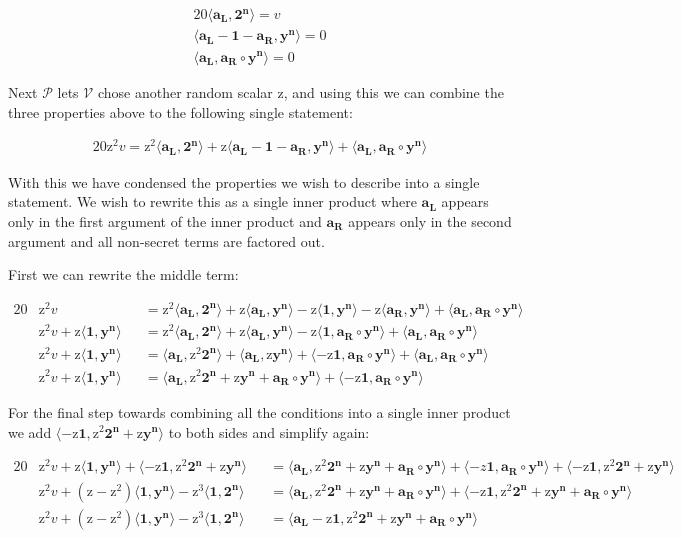 \documentclass{article}
\newcommand{\eq}[1]{\begin{alignat*}{20}#1\end{alignat*}}
\renewcommand{\vec}[1]{\boldsymbol{#1}}
\newcommand{\ran}[1]{\mathrm{#1}}
\newcommand{\vecran}[1]{\mathbf{#1}}
\newcommand{\V}{\mathcal{V}}
\renewcommand{\P}{\mathcal{P}}
\newcommand{\dotp}[2]{\langle #1, #2 \rangle}
\newcommand{\opn}[1]{\operatorname{#1}}
\newcommand{\vecl}[1]{\vec{#1_{\opn{L}}}}
\newcommand{\vecr}[1]{\vec{#1_{\opn{R}}}}
\begin{document}
\eq{
	\dotp{\vecl{a}}{\vec{2^n}} = v \\
	\dotp{\vecl{a} - \vec{1} - \vecr{a}}{\vecran{y^n}} = 0 \\
	\dotp{\vecl{a}}{\vecr{a}\circ \vecran{y^n}} = 0
}

Next $\P$ lets $\V$ chose another random scalar $\ran{z}$, and using
this we can combine the three properties above to the following single
statement:

\eq{
	\ran{z^2}v = 
	\ran{z^2}\dotp{\vecl{a}}{\vec{2^n}} +
	\ran{z}\dotp{\vecl{a} - \vec{1} - \vecr{a}}{\vecran{y^n}} +
	\dotp{\vecl{a}}{\vecr{a}\circ \vecran{y^n}}
}

With this we have condensed the properties we wish to describe into
a single statement. We wish to rewrite this as a single inner product
where $\vecl{a}$ appears only in the first argument of the inner product
and $\vecr{a}$ appears only in the second argument and all non-secret
terms are factored out.

First we can rewrite the middle term:

\eq{	
	&\ran{z^2}v &&= 
	\ran{z^2}\dotp{\vecl{a}}{\vec{2^n}} +
	\ran{z}\dotp{\vecl{a}}{\vecran{y^n}} -
	\ran{z}\dotp{\vec{1}}{\vecran{y^n}} -
	\ran{z}\dotp{\vecr{a}}{\vecran{y^n}} +
	\dotp{\vecl{a}}{\vecr{a}\circ \vecran{y^n}} \\
	&\ran{z^2}v + \ran{z}\dotp{\vec{1}}{\vecran{y^n}} 
	&&= \ran{z^2}\dotp{\vecl{a}}{\vec{2^n}} +
	\ran{z}\dotp{\vecl{a}}{\vecran{y^n}} -
	\ran{z}\dotp{\vec{1}}{\vecr{a}\circ\vecran{y^n}} +
	\dotp{\vecl{a}}{\vecr{a}\circ \vecran{y^n}} \\
	&\ran{z^2}v + \ran{z}\dotp{\vec{1}}{\vecran{y^n}} 
	&&= \dotp{\vecl{a}}{\ran{z^2}\vec{2^n}} +
	\dotp{\vecl{a}}{\ran{z}\vecran{y^n}} +
	\dotp{-\ran{z}\vec{1}}{\vecr{a}\circ\vecran{y^n}} +
	\dotp{\vecl{a}}{\vecr{a}\circ \vecran{y^n}} \\
	&\ran{z^2}v + \ran{z}\dotp{\vec{1}}{\vecran{y^n}} 
	&&= \dotp{\vecl{a}}{\ran{z^2}\vec{2^n} + \ran{z}\vecran{y^n} + \vecr{a}\circ \vecran{y^n}} +
	\dotp{-\ran{z}\vec{1}}{\vecr{a}\circ\vecran{y^n}}
}

For the final step towards combining all the conditions into a single
inner product we add $\dotp{-\ran{z}\vec{1}}{\ran{z^2}\vec{2^n} +
\ran{z}\vecran{y^n}}$ to both sides and simplify again:

\eq{
	&\ran{z^2}v + \ran{z}\dotp{\vec{1}}{\vecran{y^n}} + \dotp{-\ran{z}\vec{1}}{\ran{z^2}\vec{2^n} + \ran{z}\vecran{y^n}}
	&&= \dotp{\vecl{a}}{\ran{z^2}\vec{2^n} + \ran{z}\vecran{y^n} + \vecr{a}\circ \vecran{y^n}} +
	\dotp{-z\vec{1}}{\vecr{a}\circ\vecran{y^n}} + \dotp{-\ran{z}\vec{1}}{\ran{z^2}\vec{2^n} + \ran{z}\vecran{y^n}} \\ 
	&\ran{z^2}v + (\ran{z} - \ran{z^2})\dotp{\vec{1}}{\vecran{y^n}} - \ran{z^3}\dotp{\vec{1}}{\vec{2^n}} &&= \dotp{\vecl{a}}{\ran{z^2}\vec{2^n} + \ran{z}\vecran{y^n} + \vecr{a}\circ \vecran{y^n}} + \dotp{-\ran{z}\vec{1}}{\ran{z^2}\vec{2^n}+\ran{z}\vecran{y^n} + \vecr{a}\circ\vecran{y^n}}
	\\
	&\ran{z^2}v + (\ran{z} - \ran{z^2})\dotp{\vec{1}}{\vecran{y^n}} - \ran{z^3}\dotp{\vec{1}}{\vec{2^n}} &&= \dotp{\vecl{a}- \ran{z}\vec{1}}{\ran{z^2}\vec{2^n} + \ran{z}\vecran{y^n} + \vecr{a}\circ \vecran{y^n}}
}
\end{document}
